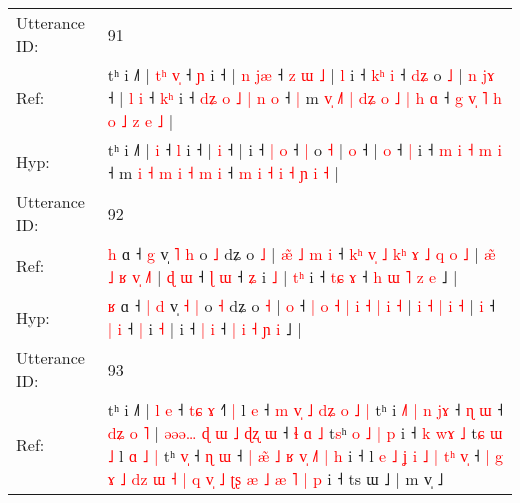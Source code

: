 \documentclass[10pt]{article}
\DeclareRobustCommand{\hl}[1]{{\textcolor{red}{#1}}}
\begin{document}
\begin{longtable}{ll}
\midrule
Utterance ID: & 91 \\
Ref: & tʰ i ˩˥ |\hl{ }\hl{t}\hl{ʰ} \hl{v}\hl{̩} ˧ \hl{ɲ} i ˧ |\hl{ }\hl{n} \hl{j}\hl{æ} ˧\hl{ }\hl{z}\hl{ }\hl{ɯ}\hl{ }\hl{˩} |\hl{ }\hl{l} i ˧ \hl{k}\hl{ʰ} \hl{i} ˧ \hl{d}\hl{ʑ} o \hl{˩} |\hl{ }\hl{n} \hl{j}\hl{ɤ} ˧ |\hl{ }\hl{l} \hl{i} ˧ \hl{k}\hl{ʰ} i ˧\hl{ }\hl{d}\hl{ʑ} \hl{o} \hl{˩} \hl{|} \hl{n} \hl{o} ˧\hl{ }\hl{|} m\hl{ }\hl{v}\hl{̩}\hl{ }\hl{˩}\hl{˥} \hl{|} \hl{d}\hl{ʑ} \hl{o} \hl{˩} \hl{|} \hl{h} \hl{ɑ} ˧\hl{ }\hl{g} \hl{v}\hl{̩} \hl{˥} \hl{h} \hl{o} \hl{˩} \hl{z} \hl{e} \hl{˩} |
 \\
Hyp: & tʰ i ˩˥ |\hl{}\hl{}\hl{} \hl{}\hl{i} ˧ \hl{l} i ˧ |\hl{}\hl{} \hl{}\hl{i} ˧\hl{}\hl{}\hl{}\hl{}\hl{}\hl{} |\hl{}\hl{} i ˧ \hl{}\hl{|} \hl{o} ˧ \hl{}\hl{|} o \hl{˧} |\hl{}\hl{} \hl{}\hl{o} ˧ |\hl{}\hl{} \hl{o} ˧ \hl{}\hl{|} i ˧\hl{}\hl{}\hl{} \hl{m} \hl{i} \hl{˧} \hl{m} \hl{i} ˧\hl{}\hl{} m\hl{}\hl{}\hl{}\hl{}\hl{}\hl{} \hl{i} \hl{}\hl{˧} \hl{m} \hl{i} \hl{˧} \hl{m} \hl{i} ˧\hl{}\hl{} \hl{}\hl{m} \hl{i} \hl{˧} \hl{i} \hl{˧} \hl{ɲ} \hl{i} \hl{˧} |
 \\
\midrule
Utterance ID: & 92 \\
Ref: & \hl{h} ɑ ˧\hl{}\hl{} \hl{g} v̩ \hl{˥} \hl{h} o \hl{˩} dʑ o \hl{˩} |\hl{ }\hl{æ}\hl{̃}\hl{ }\hl{˩}\hl{ }\hl{m} \hl{i} ˧ \hl{k}\hl{ʰ} \hl{v}\hl{̩} \hl{˩} \hl{k}\hl{ʰ} \hl{ɤ} \hl{˩} \hl{q} \hl{o} \hl{˩} | \hl{æ}\hl{̃} \hl{˩} \hl{ʁ} \hl{v}\hl{̩} \hl{˩}\hl{˥} |\hl{ }\hl{ɖ} \hl{ɯ} ˧ \hl{ɭ} \hl{ɯ} ˧ \hl{ʑ} i \hl{˩} |\hl{ }\hl{t}\hl{ʰ} i ˧ \hl{t}\hl{ɕ} \hl{ɤ} ˧ \hl{h} \hl{ɯ} \hl{˥} \hl{z} \hl{e} ˩ |
 \\
Hyp: & \hl{ʁ} ɑ ˧\hl{ }\hl{|} \hl{d} v̩ \hl{˧} \hl{|} o \hl{˧} dʑ o \hl{˧} |\hl{}\hl{}\hl{}\hl{}\hl{}\hl{}\hl{} \hl{o} ˧ \hl{}\hl{|} \hl{}\hl{o} \hl{˧} \hl{}\hl{|} \hl{i} \hl{˧} \hl{|} \hl{i} \hl{˧} | \hl{}\hl{i} \hl{˧} \hl{|} \hl{}\hl{i} \hl{}\hl{˧} |\hl{}\hl{} \hl{i} ˧ \hl{|} \hl{i} ˧ \hl{|} i \hl{˧} |\hl{}\hl{}\hl{} i ˧ \hl{}\hl{|} \hl{i} ˧ \hl{|} \hl{i} \hl{˧} \hl{ɲ} \hl{i} ˩ |
 \\
\midrule
Utterance ID: & 93 \\
Ref: & tʰ i ˩˥ |\hl{ }\hl{l} \hl{e} ˧ \hl{t}\hl{ɕ} \hl{ɤ} ˧\hl{˥}\hl{ }\hl{|} l \hl{e} ˧\hl{ }\hl{m}\hl{ }\hl{v}\hl{̩}\hl{ }\hl{˩} \hl{d}\hl{ʑ}\hl{ }\hl{o} \hl{˩} \hl{|} tʰ i \hl{˩}\hl{˥} \hl{|}\hl{ }\hl{n} \hl{j}\hl{ɤ} ˧ \hl{}\hl{ɳ} \hl{ɯ} ˧ \hl{d}\hl{ʑ} \hl{o} \hl{˥} |\hl{ }\hl{ə}\hl{ə}\hl{ə}\hl{…}\hl{ }\hl{ɖ}\hl{ }\hl{ɯ}\hl{ }\hl{˩}\hl{ }\hl{ɖ}\hl{ʐ} \hl{ɯ} ˧ \hl{ɬ} \hl{ɑ} \hl{˩} t\hl{s}ʰ\hl{ }\hl{o}\hl{ }\hl{˩}\hl{ }\hl{|}\hl{ }\hl{p} i ˧\hl{ }\hl{k}\hl{ }\hl{w}\hl{ɤ}\hl{ }\hl{˩} t\hl{ɕ} \hl{ɯ} \hl{˩} l\hl{ }\hl{ɑ} \hl{˩} \hl{|} tʰ \hl{v}\hl{̩} ˧\hl{ }\hl{ɳ} \hl{ɯ} ˧\hl{ }\hl{|}\hl{ }\hl{æ}\hl{̃}\hl{ }\hl{˩}\hl{ }\hl{ʁ} \hl{v}\hl{̩} \hl{˩}\hl{˥} \hl{|} \hl{h} i ˧ l \hl{e} \hl{˩} \hl{ʝ} \hl{i} \hl{˩} \hl{|} \hl{t}\hl{ʰ} \hl{v}\hl{̩} ˧ \hl{|} \hl{g} \hl{ɤ} \hl{˩} \hl{d}\hl{z} \hl{ɯ} \hl{˧} \hl{|} \hl{q} \hl{v}\hl{̩} \hl{˩} \hl{ʈ}\hl{ʂ} \hl{æ} \hl{˩} \hl{æ} \hl{˥} \hl{|} \hl{p} i ˧ ts ɯ ˩ | m v̩ ˩

\end{longtable}
\end{document}
